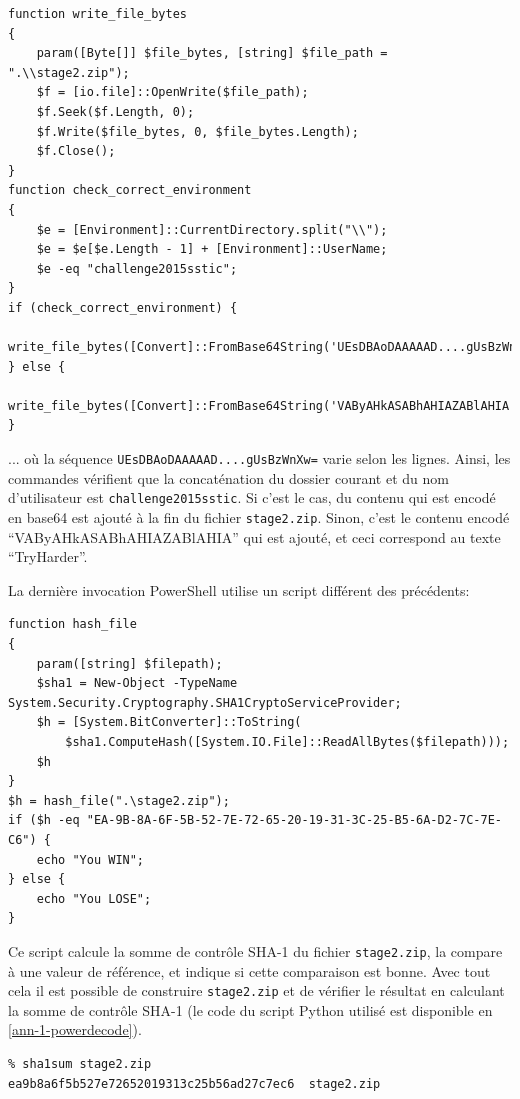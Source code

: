 \documentclass[a4paper,10pt]{article}
\begin{document}
\begin{verbatim}
function write_file_bytes
{
    param([Byte[]] $file_bytes, [string] $file_path = ".\\stage2.zip");
    $f = [io.file]::OpenWrite($file_path);
    $f.Seek($f.Length, 0);
    $f.Write($file_bytes, 0, $file_bytes.Length);
    $f.Close();
}
function check_correct_environment
{
    $e = [Environment]::CurrentDirectory.split("\\");
    $e = $e[$e.Length - 1] + [Environment]::UserName;
    $e -eq "challenge2015sstic";
}
if (check_correct_environment) {
    write_file_bytes([Convert]::FromBase64String('UEsDBAoDAAAAAD....gUsBzWnXw='));
} else {
    write_file_bytes([Convert]::FromBase64String('VAByAHkASABhAHIAZABlAHIA'));
}
\end{verbatim}

... où la séquence \texttt{UEsDBAoDAAAAAD....gUsBzWnXw=} varie selon les lignes.
Ainsi, les commandes vérifient que la concaténation du dossier courant et du nom d'utilisateur est \texttt{challenge2015sstic}.
Si c'est le cas, du contenu qui est encodé en base64 est ajouté à la fin du fichier \texttt{stage2.zip}.
Sinon, c'est le contenu encodé ``VAByAHkASABhAHIAZABlAHIA'' qui est ajouté, et ceci correspond au texte ``TryHarder''.

La dernière invocation PowerShell utilise un script différent des précédents:
\begin{verbatim}
function hash_file
{
    param([string] $filepath);
    $sha1 = New-Object -TypeName System.Security.Cryptography.SHA1CryptoServiceProvider;
    $h = [System.BitConverter]::ToString(
        $sha1.ComputeHash([System.IO.File]::ReadAllBytes($filepath)));
    $h
}
$h = hash_file(".\stage2.zip");
if ($h -eq "EA-9B-8A-6F-5B-52-7E-72-65-20-19-31-3C-25-B5-6A-D2-7C-7E-C6") {
    echo "You WIN";
} else {
    echo "You LOSE";
}
\end{verbatim}

Ce script calcule la somme de contrôle SHA-1 du fichier \texttt{stage2.zip}, la compare à une valeur de référence, et indique si cette comparaison est bonne.
Avec tout cela il est possible de construire \texttt{stage2.zip} et de vérifier le résultat en calculant la somme de contrôle SHA-1 (le code du script Python utilisé est disponible en \ref{ann-1-powerdecode}).

\begin{verbatim}
% sha1sum stage2.zip
ea9b8a6f5b527e72652019313c25b56ad27c7ec6  stage2.zip
\end{verbatim}
\end{document}
